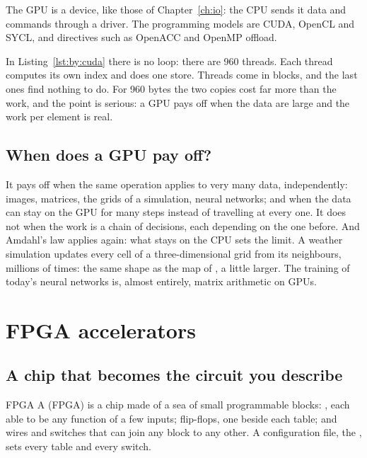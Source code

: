 The GPU is a device, like those of Chapter~\ref{ch:io}: the CPU sends it data
and commands through a driver. The programming models are CUDA, OpenCL and
SYCL, and directives such as OpenACC and OpenMP offload.


In Listing~\ref{lst:by:cuda} there is no loop: there are 960 threads. Each
thread computes its own index and does one store. Threads come in blocks,
and the last ones find nothing to do. For 960 bytes the two copies cost far
more than the work, and the point is serious: a GPU pays off when the data
are large and the work per element is real.

\subsection{When does a GPU pay off?}

It pays off when the same operation applies to very many data, independently:
images, matrices, the grids of a simulation, neural networks; and when the
data can stay on the GPU for many steps instead of travelling at every one.
It does not when the work is a chain of decisions, each depending on the one
before. And Amdahl's law applies again: what stays on the CPU sets the limit.
A weather simulation updates every cell of a three-dimensional grid from its
neighbours, millions of times: the same shape as the map of \vermone, a
little larger. The training of today's neural networks is, almost entirely,
matrix arithmetic on GPUs.

\section{FPGA accelerators}

\subsection{A chip that becomes the circuit you describe}

\begin{definition}{FPGA}
A  (FPGA) is a chip made of a sea of small
programmable blocks: , each able to be any function of a
few inputs; flip-flops, one beside each table; and wires and switches that can
join any block to any other. A configuration file, the , sets
every table and every switch.
\end{definition}

